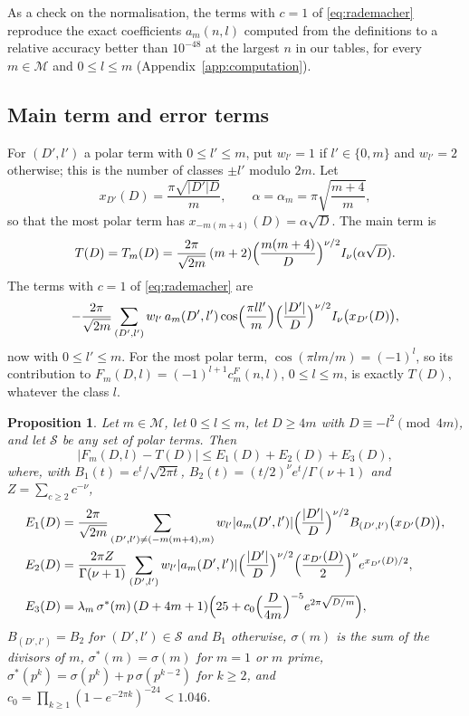 \documentclass[11pt]{amsart}
\newtheorem{proposition}[theorem]{Proposition}
\theoremstyle{definition}
\newcommand{\cF}{c^{F}}
\newcommand{\Mset}{\mathcal{M}}
\begin{document}
As a check on the normalisation, the terms with $c=1$ of \eqref{eq:rademacher} reproduce the exact coefficients $a_m(n,l)$ computed from the definitions to a relative accuracy better than $10^{-48}$ at the largest $n$ in our tables, for every $m\in\Mset$ and $0\le l\le m$ (Appendix~\ref{app:computation}).

\subsection{Main term and error terms}
For $(D',l')$ a polar term with $0\le l'\le m$, put $w_{l'}=1$ if $l'\in\{0,m\}$ and $w_{l'}=2$ otherwise; this is the number of classes $\pm l'$ modulo $2m$. Let
\[
x_{D'}(D)=\frac{\pi\sqrt{|D'|D}}{m},\qquad \alpha=\alpha_m=\pi\sqrt{\frac{m+4}{m}},
\]
so that the most polar term has $x_{-m(m+4)}(D)=\alpha\sqrt D$. The main term is
\begin{equation}\label{eq:mainterm}
T(D)=T_m(D)=\frac{2\pi}{\sqrt{2m}}\,(m+2)\Bigl(\frac{m(m+4)}{D}\Bigr)^{\nu/2}I_\nu(\alpha\sqrt D).
\end{equation}
The terms with $c=1$ of \eqref{eq:rademacher} are
\[
-\frac{2\pi}{\sqrt{2m}}\sum_{(D',l')}w_{l'}\,a_m(D',l')\cos\Bigl(\frac{\pi ll'}{m}\Bigr)\Bigl(\frac{|D'|}{D}\Bigr)^{\nu/2}I_\nu\bigl(x_{D'}(D)\bigr),
\]
now with $0\le l'\le m$. For the most polar term, $\cos(\pi lm/m)=(-1)^l$, so its contribution to $F_m(D,l)=(-1)^{l+1}\cF_m(n,l)$, $0\le l\le m$, is exactly $T(D)$, whatever the class $l$.

\begin{proposition}\label{prop:decomp}
Let $m\in\Mset$, let $0\le l\le m$, let $D\ge4m$ with $D\equiv-l^2\pmod{4m}$, and let $\mathcal S$ be any set of polar terms. Then
\[
|F_m(D,l)-T(D)|\le E_1(D)+E_2(D)+E_3(D),
\]
where, with $B_1(t)=e^t/\sqrt{2\pi t}$, $B_2(t)=(t/2)^\nu e^t/\Gamma(\nu+1)$ and $Z=\sum_{c\ge2}c^{-\nu}$,
\begin{align*}
E_1(D)&=\frac{2\pi}{\sqrt{2m}}\sum_{(D',l')\ne(-m(m+4),m)}w_{l'}|a_m(D',l')|\Bigl(\frac{|D'|}{D}\Bigr)^{\nu/2}B_{(D',l')}\bigl(x_{D'}(D)\bigr),\\
E_2(D)&=\frac{2\pi Z}{\Gamma(\nu+1)}\sum_{(D',l')}w_{l'}|a_m(D',l')|\Bigl(\frac{|D'|}{D}\Bigr)^{\nu/2}\Bigl(\frac{x_{D'}(D)}2\Bigr)^{\nu}e^{x_{D'}(D)/2},\\
E_3(D)&=\lambda_m\,\sigma^*(m)\,(D+4m+1)\Bigl(25+c_0\Bigl(\frac{D}{4m}\Bigr)^{-5}e^{2\pi\sqrt{D/m}}\Bigr),
\end{align*}
$B_{(D',l')}=B_2$ for $(D',l')\in\mathcal S$ and $B_1$ otherwise, $\sigma(m)$ is the sum of the divisors of $m$, $\sigma^*(m)=\sigma(m)$ for $m=1$ or $m$ prime, $\sigma^*(p^k)=\sigma(p^k)+p\,\sigma(p^{k-2})$ for $k\ge2$, and $c_0=\prod_{k\ge1}(1-e^{-2\pi k})^{-24}<1.046$.
\end{proposition}
\end{document}
